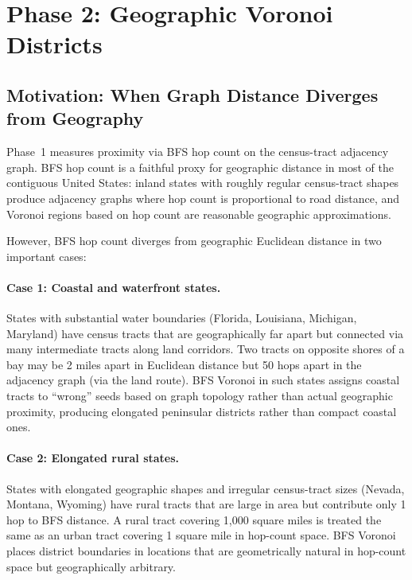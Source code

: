 \section{Phase 2: Geographic Voronoi Districts}
\label{sec:phase2}

\subsection{Motivation: When Graph Distance Diverges from Geography}

Phase~1 \cvd{} measures proximity via BFS hop count on the census-tract
adjacency graph.
BFS hop count is a faithful proxy for geographic distance in most of the
contiguous United States: inland states with roughly regular census-tract
shapes produce adjacency graphs where hop count is proportional to road
distance, and Voronoi regions based on hop count are reasonable geographic
approximations.

However, BFS hop count diverges from geographic Euclidean distance in two
important cases:

\paragraph{Case 1: Coastal and waterfront states.}
States with substantial water boundaries (Florida, Louisiana, Michigan,
Maryland) have census tracts that are geographically far apart but connected
via many intermediate tracts along land corridors.
Two tracts on opposite shores of a bay may be 2 miles apart in Euclidean
distance but 50 hops apart in the adjacency graph (via the land route).
BFS Voronoi in such states assigns coastal tracts to ``wrong'' seeds based
on graph topology rather than actual geographic proximity, producing
elongated peninsular districts rather than compact coastal ones.

\paragraph{Case 2: Elongated rural states.}
States with elongated geographic shapes and irregular census-tract sizes
(Nevada, Montana, Wyoming) have rural tracts that are large in area but
contribute only 1 hop to BFS distance.
A rural tract covering 1{,}000 square miles is treated the same as an urban
tract covering 1 square mile in hop-count space.
BFS Voronoi places district boundaries in locations that are geometrically
natural in hop-count space but geographically arbitrary.

